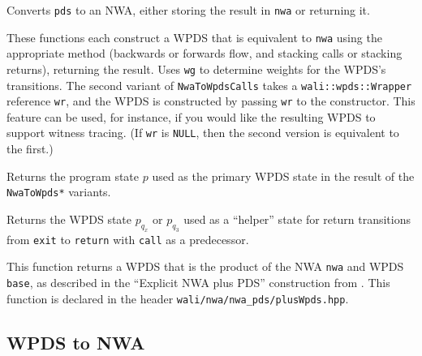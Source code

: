 \begin{functionlist}
    Converts \texttt{pds} to an NWA, either storing the result in
    \texttt{nwa} or returning it.

    These functions each construct a WPDS that is equivalent to \texttt{nwa} using the
    appropriate method (backwards or forwards flow, and stacking calls or
    stacking returns), returning the result. Uses \texttt{wg} to determine
    weights for the WPDS's transitions. The second variant of
    \texttt{NwaToWpdsCalls} takes a \texttt{wali::wpds::Wrapper} reference
    \texttt{wr}, and the WPDS is constructed by passing \texttt{wr} to the
    constructor. This feature can be used, for instance, if you would like the
    resulting WPDS to support witness tracing. (If \texttt{wr} is
    \texttt{NULL}, then the second version is equivalent to the first.)

    Returns the program state $p$ used as the primary WPDS state in the
    result of the \texttt{NwaToWpds*} variants.

    Returns the WPDS state $p_{q_x}$ or $p_{q_3}$ used as a ``helper'' state
    for return transitions from \texttt{exit} to \texttt{return} with
    \texttt{call} as a predecessor.

    This function returns a WPDS that is the
    product of the NWA \texttt{nwa} and WPDS \texttt{base}, as described in the ``Explicit
    NWA plus PDS'' construction from \cite[\S6]{advancedquerying}. This
    function is declared in the header
    \texttt{wali/nwa/nwa\_pds/plusWpds.hpp}.
\end{functionlist}


\subsection{WPDS to NWA}
\label{Se:WpdsToNwa}

